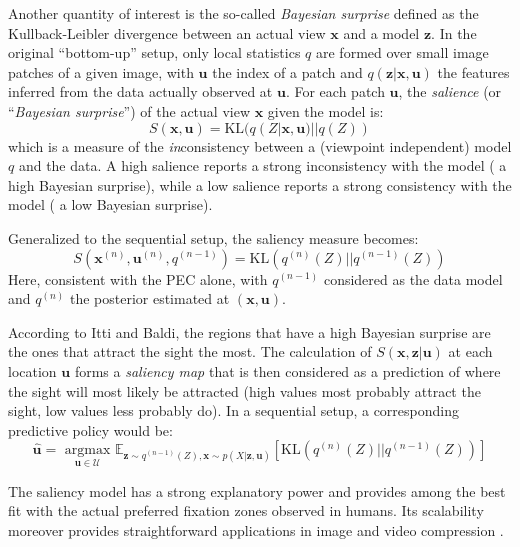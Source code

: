 \documentclass[12pt,twoside,openright]{article}
\begin{document}
Another quantity of interest is the so-called \emph{Bayesian surprise} \cite{itti2005bayesian} defined as the Kullback-Leibler divergence {\color{blue} between an actual view $\boldsymbol{x}$ and a model $\boldsymbol{z}$}. In the original ``bottom-up'' setup, only local statistics $q$ are formed over small image patches of a given image, with $\boldsymbol{u}$ the index of a patch and $q(\boldsymbol{z}|\boldsymbol{x},\boldsymbol{u})$ the features inferred from the data actually observed at $\boldsymbol{u}$. For each patch $\boldsymbol{u}$, the \emph{salience} (or ``\emph{Bayesian surprise}'') of the actual view $\boldsymbol{x}$ given the model is:
$$ S(\boldsymbol{x},\boldsymbol{u}) = \text{KL}(q(Z| \boldsymbol{x}, \boldsymbol{u})||q(Z))$$
which is a measure of the \emph{in}consistency between a (viewpoint independent)  model $q$ and the data. A high salience reports a strong inconsistency with the model ({\color{blue} a high Bayesian surprise}), while a low salience reports a strong consistency with the model ({\color{blue} a low Bayesian surprise}).

Generalized to the sequential setup, the saliency measure becomes:
$$ S(\boldsymbol{x}^{(n)},\boldsymbol{u}^{(n)}, q^{(n-1)}) = \text{KL}(q^{(n)}(Z)||q^{(n-1)}(Z))$$
Here, consistent with the PEC alone, 
with $q^{(n-1)}$ considered as the data model and $q^{(n)}$ the posterior estimated at $(\boldsymbol{x},\boldsymbol{u})$.

According to Itti and Baldi, the regions that have a high Bayesian surprise are the ones that attract the sight the most. The calculation of $S(\boldsymbol{x}, \boldsymbol{z}| \boldsymbol{u})$ at each location $\boldsymbol{u}$ forms a \emph{saliency map} that is then considered as a prediction of where the sight will most likely be attracted (high values most probably attract the sight, low values less probably do). 
In a sequential setup, a corresponding predictive policy would be:
$$ \hat{\boldsymbol{u}} = \underset{\boldsymbol{u} \in \mathcal{U}}{\text{ argmax }} \mathbb{E}_{\boldsymbol{z} \sim q^{(n-1)}(Z), \boldsymbol{x} \sim p(X|\boldsymbol{z}, \boldsymbol{u})}\left[\text{KL}(q^{(n)}(Z)||q^{(n-1)}(Z))\right]$$


The saliency model has a strong explanatory power and provides among the best fit with the actual preferred fixation zones observed in humans.
Its scalability moreover provides straightforward applications in image and video compression  \cite{wang2003foveation,guo2010novel}.
\end{document}
